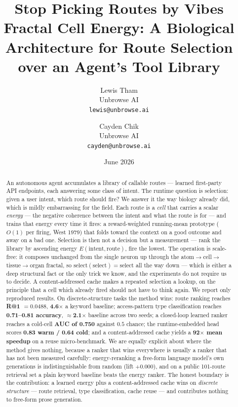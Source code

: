 \documentclass[11pt]{article}
\title{\textbf{Stop Picking Routes by Vibes}\\
\large Fractal Cell Energy: A Biological Architecture for Route Selection over an Agent's Tool Library}
\author{Lewis Tham\\ Unbrowse AI \\ \texttt{lewis@unbrowse.ai}
  \and Cayden Chik\\ Unbrowse AI \\ \texttt{cayden@unbrowse.ai}}
\date{June 2026}
\begin{document}
\maketitle

\begin{abstract}
An autonomous agent accumulates a library of callable routes --- learned
first-party API endpoints, each answering some class of intent. The runtime
question is selection: given a user intent, which route should fire? We answer
it the way biology already did, which is mildly embarrassing for the field.
Each route is a \emph{cell} that carries a scalar \emph{energy} --- the negative
coherence between the intent and what the route is for --- and trains that energy
every time it fires: a reward-weighted running-mean prototype ($O(1)$ per firing,
West 1979) that folds toward the context on a good outcome and away on a bad one.
Selection is then not a decision but a measurement --- rank the library by
ascending energy $E(\text{intent}, \text{route})$, fire the lowest. The operation
is scale-free: it composes unchanged from the single neuron up through the
atom$\to$cell$\to$tissue$\to$organ fractal, so $\text{select}(\text{select}) =
\text{select}$ all the way down --- which is either a deep structural fact or the
only trick we know, and the experiments do not require us to decide. A
content-addressed cache makes a repeated selection a lookup, on the principle
that a cell which already fired should not have to think again. We report only reproduced
results. On discrete-structure tasks the method wins: route ranking reaches
\textbf{R@1 $=0.0488$}, \textbf{4.6$\times$} a keyword baseline; access-pattern
type classification reaches \textbf{0.71--0.81 accuracy}, \textbf{$\approx$2.1$\times$}
baseline across two seeds; a closed-loop learned ranker reaches a cold-cell
\textbf{AUC of 0.750} against $0.5$ chance; the runtime-embedded head scores
\textbf{0.83 warm / 0.64 cold}; and a content-addressed cache yields a
\textbf{92$\times$ mean speedup} on a reuse micro-benchmark. We are equally
explicit about where the method gives nothing, because a ranker that wins everywhere
is usually a ranker that has not been measured carefully: energy-reranking a free-form
language model's own generations is indistinguishable from random
(lift $+0.000$), and on a public 101-route retrieval set a plain keyword
baseline beats the energy ranker. The honest boundary is the contribution: a
learned energy plus a content-addressed cache wins on \emph{discrete structure}
--- route retrieval, type classification, cache reuse --- and contributes nothing
to free-form prose generation.
\end{abstract}
\end{document}
